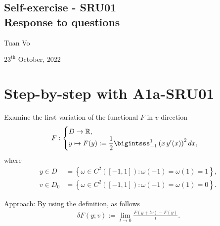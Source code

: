 \documentclass[12pt]{article}
\begin{document}
\begin{center}
	\section*{Self-exercise - SRU01\\ Response to questions}
\end{center}
\begin{center}
	Tuan Vo
\end{center}
\begin{center}
	$23^{\text{th}}$ October, 2022
\end{center}
\section{Step-by-step with A1a-SRU01}
\begin{exampleboxed}
	Examine the first variation of the functional $F$ in $v$ direction
	\begin{align}
		\label{eq:functionalexample}
		F:
		\begin{cases}
			D \rightarrow \mathbb{R}, \\
			\displaystyle
			y \mapsto
			F(y):= 
			\frac{1}{2}
			\bigintsss_{-1}^1
			\left( x\,y'(x) \right)^2 dx,
		\end{cases}
	\end{align}
	where 
	\begin{align}
		y \in D     & = \left\{ \omega \in C^2([-1,1]): \omega(-1)=\omega(1)=1 \right\}, 
		\label{eq:conditiony}
		\\
		v \in D_{0} & = \left\{ \omega \in C^2([-1,1]): \omega(-1)=\omega(1)=0 \right\}.
		\label{eq:conditionv}
	\end{align}
\end{exampleboxed}

Approach: By using the definition, as follows 
\begin{align}
	\label{eq:variationformular}
	\boxed{
		\delta F(y;v) := \lim_{t\to 0}\frac{F(y+tv)-F(y)}{t}.
	}
\end{align}
\end{document}
